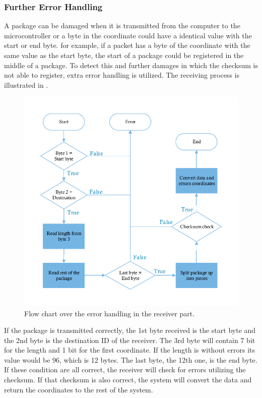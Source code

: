 \subsubsection{Further Error Handling}
A package can be damaged when it is transmitted from the computer to the microcontroller or a byte in the coordinate could have a identical value with the start or end byte. for example, if a packet has a byte of the coordinate with the same value as the start byte, the start of a package could be registered in the middle of a package. To detect this and further damages in which the checksum is not able to register, extra error handling is utilized. The receiving process is illustrated in .

\begin{figure}[H]
\centering
\includegraphics[scale=1.1]{figures/FlowReceiver.pdf}
\caption{Flow chart over the error handling in the receiver part.}
\label{FlowReceiver}
\end{figure}\vspace{-5mm}

If the package is transmitted correctly, the 1st byte received is the start byte and the 2nd byte is the destination ID of the receiver. The 3rd byte will contain 7 bit for the length and 1 bit for the first coordinate. If the length is without errors its value would be 96, which is 12 bytes. The last byte, the 12th one, is the end byte. If these condition are all correct, the receiver will check for errors utilizing the checksum. If that checksum is also correct, the system will convert the data and return the coordinates to the rest of the system.

